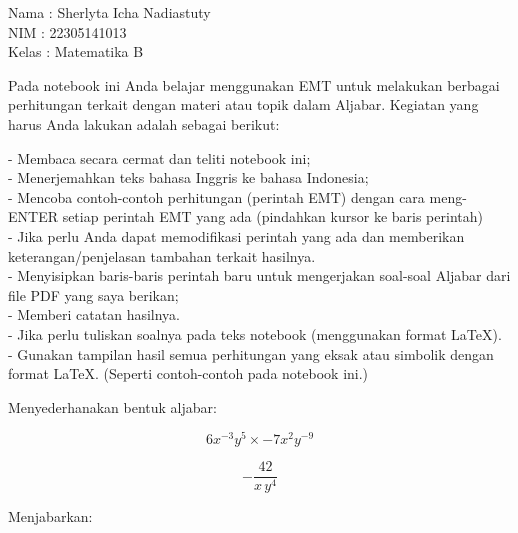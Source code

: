 \documentclass{article}
\begin{document}
\begin{eulernotebook}
\begin{eulercomment}
Nama  : Sherlyta Icha Nadiastuty\\
NIM   : 22305141013\\
Kelas : Matematika B

\begin{eulercomment}
\begin{eulercomment}
Pada notebook ini Anda belajar menggunakan EMT untuk melakukan
berbagai perhitungan terkait dengan materi atau topik dalam Aljabar.
Kegiatan yang harus Anda lakukan adalah sebagai berikut:

- Membaca secara cermat dan teliti notebook ini;\\
- Menerjemahkan teks bahasa Inggris ke bahasa Indonesia;\\
- Mencoba contoh-contoh perhitungan (perintah EMT) dengan cara
meng-ENTER setiap perintah EMT yang ada (pindahkan kursor ke baris
perintah)\\
- Jika perlu Anda dapat memodifikasi perintah yang ada dan memberikan
keterangan/penjelasan tambahan terkait hasilnya.\\
- Menyisipkan baris-baris perintah baru untuk mengerjakan soal-soal
Aljabar dari file PDF yang saya berikan;\\
- Memberi catatan hasilnya.\\
- Jika perlu tuliskan soalnya pada teks notebook (menggunakan format
LaTeX).\\
- Gunakan tampilan hasil semua perhitungan yang eksak atau simbolik
dengan format LaTeX. (Seperti contoh-contoh pada notebook ini.)

\end{eulercomment}
\begin{eulercomment}
Menyederhanakan bentuk aljabar:

\end{eulercomment}
\begin{eulerformula}
\[
6x^{-3}y^5\times -7x^2y^{-9}
\]
\end{eulerformula}
\begin{eulercomment}
\end{eulercomment}
\begin{eulerformula}
\[
-\frac{42}{x\,y^4}
\]
\end{eulerformula}
\begin{eulercomment}
Menjabarkan:


\end{eulercomment}
\end{eulercomment}
\end{eulercomment}
\end{eulernotebook}
\end{document}
